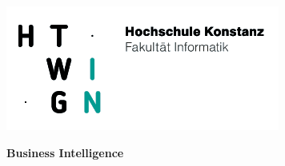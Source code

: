 \noindent
\begin{minipage}[t]{0.4\textwidth} 
\includegraphics[width=\linewidth]{htwg_logo.png}
\end{minipage}%
\hfill%
\begin{minipage}[t]{0.6\textwidth}\raggedleft
\textbf{\large Business Intelligence}
\end{minipage}


